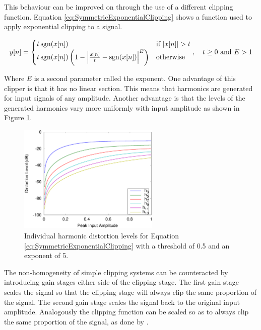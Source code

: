 			This behaviour can be improved on through the use of a different clipping function. Equation
			\ref{eq:SymmetricExponentialClipping} shows a function used to apply exponential clipping to a
			signal.
			
			\begin{equation}
				y[n] = \begin{cases}
					t\operatorname{sgn}(x[n]) & \text{if $|x[n]| > t$} \\
					t\operatorname{sgn}(x[n]) \left(1 - \left|\frac{x[n]}{t} - \operatorname{sgn}(x[n]) \right|^{E} \right) &
						\text{otherwise}
				\end{cases}, \quad t \geq 0 \ \text{and} \ E > 1
				\label{eq:SymmetricExponentialClipping}
			\end{equation}

			Where $E$ is a second parameter called the exponent. One advantage of this clipper is that it has
			no linear section. This means that harmonics are generated for input signals of any amplitude.
			Another advantage is that the levels of the generated harmonics vary more uniformly with input
			amplitude as shown in Figure \ref{fig:ExponentialClippingHarmonics}.

			\begin{figure}[h!]
				\centering
				\includegraphics[width=0.6\textwidth]{chapter3/Images/ExponentialClippingHarmonics.eps}
				\caption{Individual harmonic distortion levels for Equation
					 \ref{eq:SymmetricExponentialClipping} with a threshold of 0.5 and an 
				         exponent of 5.}
				\label{fig:ExponentialClippingHarmonics}
			\end{figure}

			The non-homogeneity of simple clipping systems can be counteracted by introducing gain stages
			either side of the clipping stage. The first gain stage scales the signal so that the clipping
			stage will always clip the same proportion of the signal. The second gain stage scales the signal
			back to the original input amplitude. Analogously the clipping function can be scaled so as to
			always clip the same proportion of the signal, as done by \citet{deman2014adaptive}.

